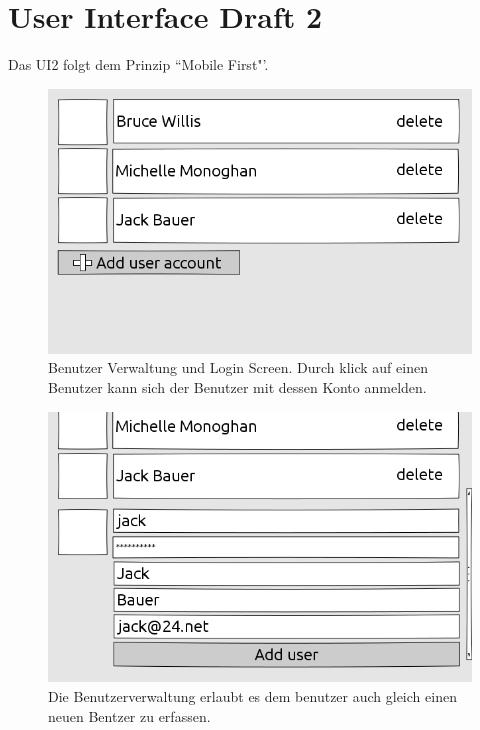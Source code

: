 \section{User Interface Draft 2}
	Das UI2 folgt dem Prinzip ``Mobile First"'.
	\begin{figure}[H]
		\centering
		\includegraphics[height=0.35\textheight]{../ui/img/uiDraft2/UserView-selectUser.png}
		\caption[Accound screen draft2]{Benutzer Verwaltung und Login Screen. Durch klick auf einen Benutzer kann sich der Benutzer mit dessen Konto anmelden.}
		\label{login screen}
	\end{figure}
	\begin{figure}[H]
		\centering
		\includegraphics[height=0.35\textheight]{../ui/img/uiDraft2/UserView-addUser.png}
		\caption[Account management Screen draft2]{Die Benutzerverwaltung erlaubt es dem benutzer auch gleich einen neuen Bentzer zu erfassen.}
		\label{user management screen}
	\end{figure}
